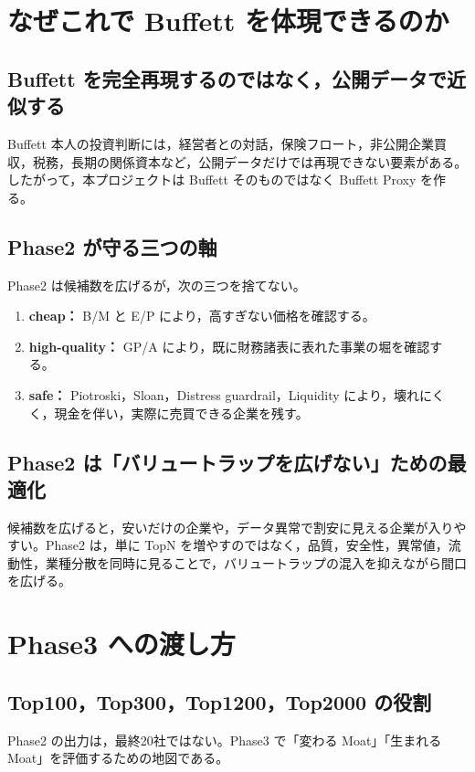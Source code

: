 \documentclass[a4paper,10pt]{article}
\newcommand{\1}{\mathbf{1}}
\begin{document}
\section{なぜこれで Buffett を体現できるのか}

\subsection{Buffett を完全再現するのではなく，公開データで近似する}
Buffett 本人の投資判断には，経営者との対話，保険フロート，非公開企業買収，税務，長期の関係資本など，公開データだけでは再現できない要素がある。したがって，本プロジェクトは Buffett そのものではなく Buffett Proxy を作る。

\subsection{Phase2 が守る三つの軸}
Phase2 は候補数を広げるが，次の三つを捨てない。

\begin{enumerate}[label=\arabic*.]
\item \textbf{cheap：} B/M と E/P により，高すぎない価格を確認する。
\item \textbf{high-quality：} GP/A により，既に財務諸表に表れた事業の堀を確認する。
\item \textbf{safe：} Piotroski，Sloan，Distress guardrail，Liquidity により，壊れにくく，現金を伴い，実際に売買できる企業を残す。
\end{enumerate}

\subsection{Phase2 は「バリュートラップを広げない」ための最適化}
候補数を広げると，安いだけの企業や，データ異常で割安に見える企業が入りやすい。Phase2 は，単に TopN を増やすのではなく，品質，安全性，異常値，流動性，業種分散を同時に見ることで，バリュートラップの混入を抑えながら間口を広げる。

\section{Phase3 への渡し方}

\subsection{Top100，Top300，Top1200，Top2000 の役割}
Phase2 の出力は，最終20社ではない。Phase3 で「変わる Moat」「生まれる Moat」を評価するための地図である。
\end{document}
